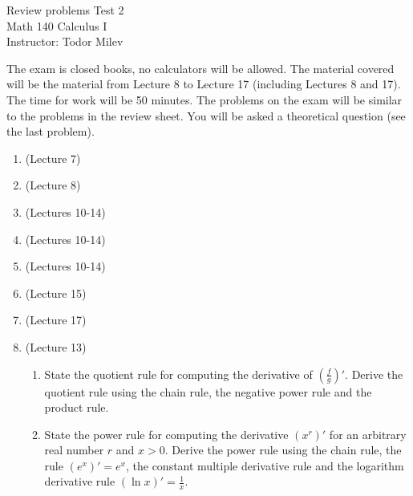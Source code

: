 \documentclass{article}
\begin{document}
\begin{center}
\Large
Review problems Test 2\\ Math 140 Calculus I \\ \normalsize Instructor: Todor Milev
\end{center}


\noindent The exam is closed books, no calculators will be allowed. The material covered will be the material from Lecture 8 to Lecture 17 (including Lectures 8 and 17). The time for work will be 50 minutes. The problems on the exam will be similar to the problems in the review sheet. You will be asked a theoretical question (see the last problem).

\begin{enumerate}
\item (Lecture 7) 
\item (Lecture 8) 
\item (Lectures 10-14)

\item (Lectures 10-14) 
\item (Lectures 10-14) 
\item (Lecture 15) 
\item (Lecture 17) 
\item (Lecture 13)
\begin{enumerate}
\item State the quotient rule for computing the derivative of $\left(\frac{f}{g}\right)'$. Derive the quotient rule
using the chain rule, the negative power rule and the product rule.
\item State the power rule for computing the derivative
$\left(x^r\right)'$ for an arbitrary real number $r$ and $x>0$. Derive the power rule using the chain rule, the rule $\left(e^{x}\right)'=e^x$, the constant multiple derivative rule and the logarithm derivative rule $(\ln x)'=\frac{1}x$.
\end{enumerate}
\end{enumerate}

\end{document}
